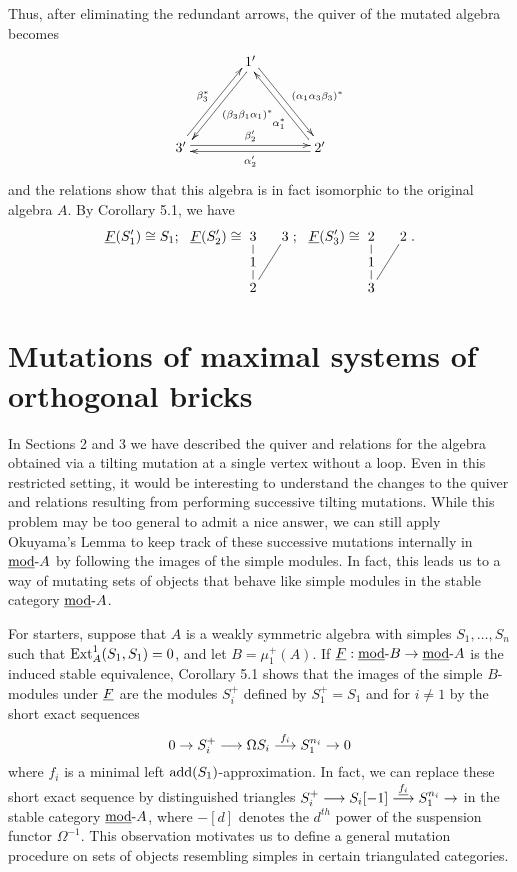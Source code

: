 \documentclass{amsart}
\begin{document}
\vspace{2mm}
Thus, after eliminating the redundant arrows, the quiver of the mutated algebra becomes
$$\xymatrixrowsep{4pc} \xymatrixcolsep{3pc} \xymatrix{ & 1' \ar[dr]<.5ex>^{(\alpha_1 \alpha_3 \beta_3)^*} \ar[dl]<.5ex>^{(\beta_3 \beta_1 \alpha_1)^*} \\ 3' \ar[rr]<.5ex>^{\beta'_2} \ar[ur]<.5ex>^{\beta_3^*} & & 2' \ar[ll]<.5ex>^{\alpha'_2} \ar[ul]<.5ex>^(.4){\alpha_1^*}}$$
and the relations show that this algebra is in fact isomorphic to the original algebra $A$.  By Corollary 5.1, we have $$ \und{F}(S'_1) \cong S_1;\ \  \und{F}(S'_2) \cong \xymatrixrowsep{.5pc} \xymatrixcolsep{1pc} \xymatrix{3 \ar@{-}[d] & 3 \ar@{-}[ddl] \\ 1 \ar@{-}[d] \\ 2}; \ \ \und{F}(S'_3) \cong \xymatrixrowsep{.5pc} \xymatrixcolsep{1pc} \xymatrix{2 \ar@{-}[d] & 2 \ar@{-}[ddl] \\ 1 \ar@{-}[d] \\ 3}.$$



\section{Mutations of maximal systems of orthogonal bricks}

In Sections 2 and 3 we have described the quiver and relations for the algebra obtained via a tilting mutation at a single vertex without a loop.  Even in this restricted setting, it would be interesting to understand the changes to the quiver and relations resulting from performing successive tilting mutations.  While this problem may be too general to admit a nice answer, we can still apply Okuyama's Lemma to keep track of these successive mutations internally in $\stmod A$ by following the images of the simple modules.  In fact, this leads us to a way of mutating sets of objects that behave like simple modules in the stable category $\stmod A$.

For starters, suppose that $A$ is a weakly symmetric algebra with simples $S_1, \ldots, S_n$ such that $\Ext^1_A(S_1,S_1)=0$, and let $B = \mu^+_1(A)$.   If $\und{F} : \stmod B \rightarrow \stmod A$ is the induced stable equivalence, Corollary 5.1 shows that the images of the simple $B$-modules under $\und{F}$ are the modules $S^+_i$ defined by $S^+_1 = S_1$ and for $i \neq 1$ by the short exact sequences $$\ses{S^+_i}{\Omega S_i}{S_1^{n_i}}{}{f_i}$$ where $f_i$ is a minimal left $\add(S_1)$-approximation.  In fact, we can replace these short exact sequence by distinguished triangles $S^+_i \longrightarrow S_i[-1] \stackrel{\und{f_i}}{\longrightarrow} S_1^{n_i} \rightarrow$ in the stable category $\stmod A$, where $-[d]$ denotes the $d^{th}$ power of the suspension functor $\Omega^{-1}$.  This observation motivates us to define a general mutation procedure on sets of objects resembling simples in certain triangulated categories.
\end{document}
